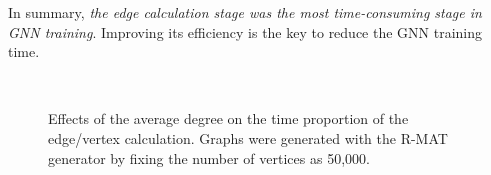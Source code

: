 In summary, \emph{the edge calculation stage was the most time-consuming stage in GNN training}.
%
Improving its efficiency is the key to reduce the GNN training time.

\begin{figure}[H]
    \centering
    \\
    \caption{Effects of the average degree on the time proportion of the edge/vertex calculation. Graphs were generated with the R-MAT generator by fixing the number of vertices as 50,000. }
    \label{fig:exp_avg_degree_on_vertex_edge_cal_time}
\end{figure}

